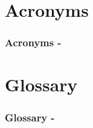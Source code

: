 %
%
%

\section*{Acronyms}

\begin{frame}[t,allowframebreaks]
  \frametitle{Acronyms -}
  \printglossary[type=\acronymtype]
\end{frame}



%
%
%

\section*{Glossary}

\begin{frame}[t,allowframebreaks]
  \frametitle{Glossary -}
  \printglossary[type=main]
\end{frame}

